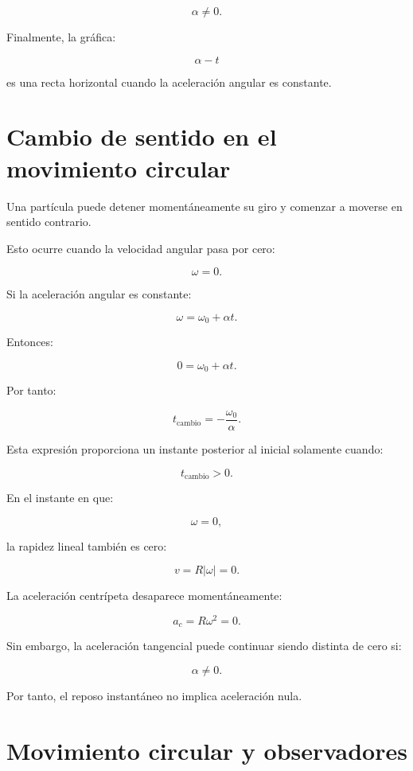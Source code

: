 \[
\alpha\neq0.
\]

Finalmente, la gráfica:

\[
\alpha-t
\]

es una recta horizontal cuando la aceleración angular es constante.


\section{Cambio de sentido en el movimiento circular}

Una partícula puede detener momentáneamente su giro y comenzar a moverse en
sentido contrario.

Esto ocurre cuando la velocidad angular pasa por cero:

\[
\omega=0.
\]

Si la aceleración angular es constante:

\[
\omega=\omega_0+\alpha t.
\]

Entonces:

\[
0=\omega_0+\alpha t.
\]

Por tanto:

\[
\boxed{
t_{\mathrm{cambio}}
=
-\frac{\omega_0}{\alpha}
}.
\]

Esta expresión proporciona un instante posterior al inicial solamente cuando:

\[
t_{\mathrm{cambio}}>0.
\]

\begin{interpretacion}

En el instante en que:

\[
\omega=0,
\]

la rapidez lineal también es cero:

\[
v=R|\omega|=0.
\]

La aceleración centrípeta desaparece momentáneamente:

\[
a_c=R\omega^2=0.
\]

Sin embargo, la aceleración tangencial puede continuar siendo distinta de
cero si:

\[
\alpha\neq0.
\]

Por tanto, el reposo instantáneo no implica aceleración nula.

\end{interpretacion}


\section{Movimiento circular y observadores}

